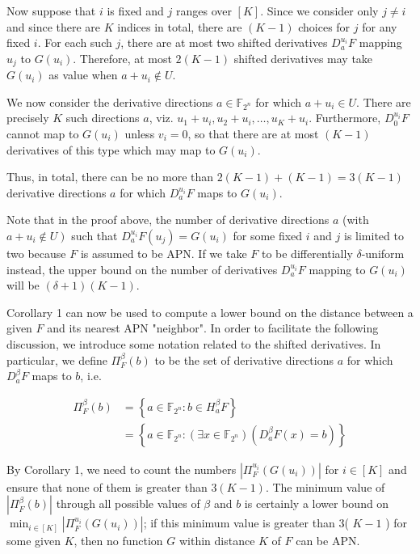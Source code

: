 \documentclass[10pt]{article}
\begin{document}
Now suppose that $i$ is fixed and $j$ ranges over $[K]$. Since we consider only $j \neq i$ and since there are $K$ indices in total, there are $(K-1)$ choices for $j$ for any fixed $i$. For each such $j$, there are at most two shifted derivatives $D_{a}^{u_{i}} F$ mapping $u_{j}$ to $G\left(u_{i}\right)$. Therefore, at most $2(K-1)$ shifted derivatives may take $G\left(u_{i}\right)$ as value when $a+u_{i} \notin U$.

We now consider the derivative directions $a \in \mathbb{F}_{2^{n}}$ for which $a+u_{i} \in U$. There are precisely $K$ such directions $a$, viz. $u_{1}+u_{i}, u_{2}+u_{i}, \ldots, u_{K}+u_{i}$. Furthermore, $D_{0}^{u_{i}} F$ cannot map to $G\left(u_{i}\right)$ unless $v_{i}=0$, so that there are at most $(K-1)$ derivatives of this type which may map to $G\left(u_{i}\right)$.

Thus, in total, there can be no more than $2(K-1)+ (K-1)=3(K-1)$ derivative directions $a$ for which $D_{a}^{u_{i}} F$ maps to $G\left(u_{i}\right)$.

Note that in the proof above, the number of derivative directions $a$ (with $\left.a+u_{i} \notin U\right)$ such that $D_{a}^{u_{i}} F\left(u_{j}\right)=G\left(u_{i}\right)$ for some fixed $i$ and $j$ is limited to two because $F$ is assumed to be APN. If we take $F$ to be differentially $\delta$-uniform instead, the upper bound on the number of derivatives $D_{a}^{u_{i}} F$ mapping to $G\left(u_{i}\right)$ will be $(\delta+1)(K-1)$.

Corollary 1 can now be used to compute a lower bound on the distance between a given $F$ and its nearest APN "neighbor". In order to facilitate the following discussion, we introduce some notation related to the shifted derivatives. In particular, we define $\Pi_{F}^{\beta}(b)$ to be the set of derivative directions $a$ for which $D_{a}^{\beta} F$ maps to $b$, i.e.

$$
\begin{aligned}
\Pi_{F}^{\beta}(b) & =\left\{a \in \mathbb{F}_{2^{n}}: b \in H_{a}^{\beta} F\right\} \\
& =\left\{a \in \mathbb{F}_{2^{n}}:\left(\exists x \in \mathbb{F}_{2^{n}}\right)\left(D_{a}^{\beta} F(x)=b\right)\right\}
\end{aligned}
$$

By Corollary 1, we need to count the numbers $\left|\Pi_{F}^{u_{i}}\left(G\left(u_{i}\right)\right)\right|$ for $i \in[K]$ and ensure that none of them is greater than $3(K-1)$. The minimum value of $\left|\Pi_{F}^{\beta}(b)\right|$ through all possible values of $\beta$ and $b$ is certainly a lower bound on $\min _{i \in[K]}\left|\Pi_{F}^{u_{i}}\left(G\left(u_{i}\right)\right)\right|$; if this minimum value is greater than 3( $K-1$ ) for some given $K$, then no function $G$ within distance $K$ of $F$ can be APN.
\end{document}
